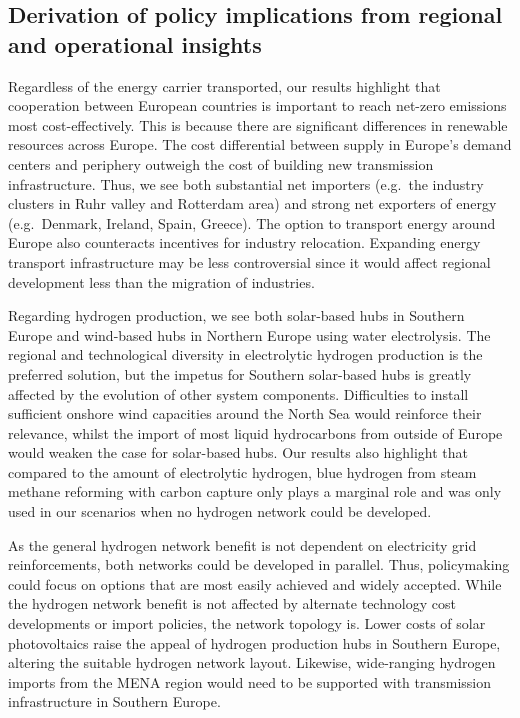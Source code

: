 \subsection*{Derivation of policy implications from regional and operational insights}
\label{sec:policy}

Regardless of the energy carrier transported, our results highlight that
cooperation between European countries is important to reach net-zero \co
emissions most cost-effectively. This is because there are significant
differences in renewable resources across Europe. The cost differential between
supply in Europe's demand centers and periphery outweigh the cost of building
new transmission infrastructure. Thus, we see both substantial net importers
(e.g.~the industry clusters in Ruhr valley and Rotterdam area) and strong net
exporters of energy (e.g.~Denmark, Ireland, Spain, Greece). The option to
transport energy around Europe also counteracts incentives for industry
relocation. Expanding energy transport infrastructure may be less controversial
since it would affect regional development less than the migration of
industries.

Regarding hydrogen production, we see both solar-based hubs in Southern Europe
and wind-based hubs in Northern Europe using water electrolysis. The regional
and technological diversity in electrolytic hydrogen production is the preferred
solution, but the impetus for Southern solar-based hubs is greatly affected by
the evolution of other system components. Difficulties to install sufficient
onshore wind capacities around the North Sea would reinforce their relevance,
whilst the import of most liquid hydrocarbons from outside of Europe would
weaken the case for solar-based hubs. Our results also highlight that compared
to the amount of electrolytic hydrogen, blue hydrogen from steam methane
reforming with carbon capture only plays a marginal role and was only used in
our scenarios when no hydrogen network could be developed.

As the general hydrogen network benefit is not dependent on electricity grid
reinforcements, both networks could be developed in parallel. Thus, policymaking
could focus on options that are most easily achieved and widely accepted. While
the hydrogen network benefit is not affected by alternate technology cost
developments or import policies, the network topology is. Lower costs of solar
photovoltaics raise the appeal of hydrogen production hubs in Southern Europe,
altering the suitable hydrogen network layout. Likewise, wide-ranging hydrogen
imports from the MENA region would need to be supported with transmission
infrastructure in Southern Europe.

